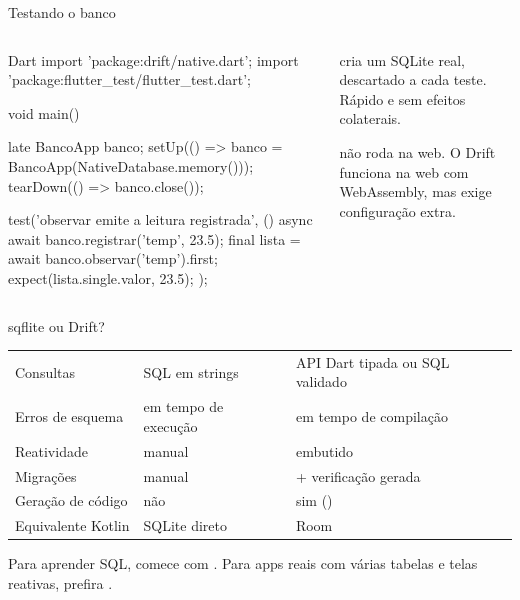 \documentclass[aspectratio=169,10pt]{beamer}
\begin{document}
\begin{frame}[fragile]{Testando o banco}
  \begin{columns}[T]
    \begin{column}{0.56\textwidth}
\begin{codigo}[title=test/banco\_test.dart]{Dart}
import 'package:drift/native.dart';
import 'package:flutter_test/flutter_test.dart';

void main() {
  late BancoApp banco;
  setUp(() => banco = BancoApp(NativeDatabase.memory()));
  tearDown(() => banco.close());

  test('observar emite a leitura registrada', () async {
    await banco.registrar('temp', 23.5);
    final lista = await banco.observar('temp').first;
    expect(lista.single.valor, 23.5);
  });
}
\end{codigo}
    \end{column}
    \begin{column}{0.42\textwidth}
      \begin{conceito}
         cria um SQLite real, descartado a cada teste. Rápido e sem efeitos colaterais.
      \end{conceito}
      \begin{atencao}[Web]
         não roda na web. O Drift funciona na web com WebAssembly, mas exige configuração extra.
      \end{atencao}
    \end{column}
  \end{columns}
\end{frame}

\begin{frame}{sqflite ou Drift?}
  \footnotesize
  \begin{tabularx}{\textwidth}{@{}l L L@{}}
    \toprule
    &  &  \\
    \midrule
    Consultas & SQL em strings & API Dart tipada ou SQL validado \\
    Erros de esquema & em tempo de execução & em tempo de compilação \\
    Reatividade & manual &  embutido \\
    Migrações &  manual &  + verificação gerada \\
    Geração de código & não & sim () \\
    Equivalente Kotlin & SQLite direto & Room \\
    \bottomrule
  \end{tabularx}
  \vspace{4pt}
  \begin{caixaambar}
    Para aprender SQL, comece com . Para apps reais com várias tabelas e telas reativas, prefira .
  \end{caixaambar}
\end{frame}
\end{document}
